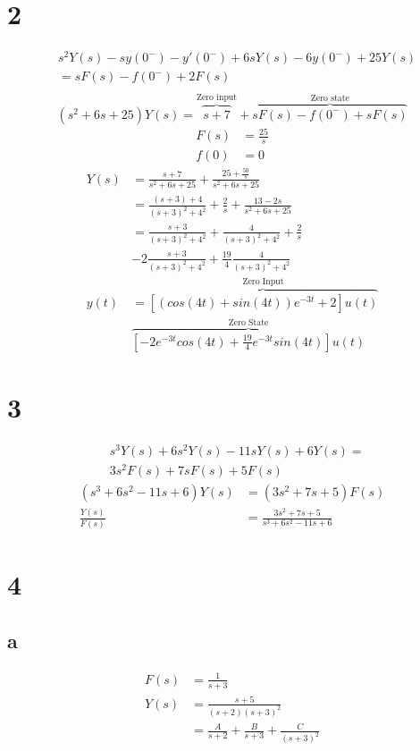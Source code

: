 \documentclass{article}
\begin{document}
\begin{multicols}{2}
\section*{2}
\begin{align*}
&s^2 Y(s) - s y(0^-) - y'(0^-) + 6 sY(s) - 6y(0^-)+25Y(s)\\
&= sF(s) - f(0^-) + 2F(s)\\
\end{align*}
\[
(s^2+6s+25)Y(s) = \overbrace{s+7}^{\text{Zero input}} + \overbrace{sF(s) - f(0^-) + sF(s)}^{\text{Zero state}}
\]
\begin{align*}
    F(s) &= \frac{25}{s}\\
    f(0) &= 0
\end{align*}
\begin{align*}
    Y(s) &= \frac{s+7}{s^2+6s+25} + \frac{25+ \frac{50}{s}}{s^2+6s+25}\\
    &= \frac{(s+3)+4}{(s+3)^2+4^2} + \frac{2}{s} + \frac{13-2s}{s^2+6s+25}\\
    &= \frac{s+3}{(s+3)^2+4^2} + \frac{4}{(s+3)^2+4^2} + \frac{2}{s}\\
    &-2 \frac{s+3}{(s+3)^2+4^2} + \frac{19}{4}\frac{4}{(s+3)^2+4^2}\\
    y(t) &= \overbrace{\left[\left( cos(4t) + sin(4t) \right) e^{-3t} + 2\right]u(t)}^{\text{Zero Input}}\\
    &\overbrace{\left[- 2e^{-3t}cos(4t) + \frac{19}{4}e^{-3t}sin(4t)\right]u(t)}^{\text{Zero State}}
\end{align*}
\section*{3}
\begin{align*}
&s^3 Y(s) + 6s^2 Y(s) -11 sY(s) + 6 Y(s) =\\
&3s^2 F(s) + 7sF(s) +5F(s)
\end{align*}
\begin{align*}
    (s^3 + 6s^2 -11 s + 6) Y(s) &= (3s^2 + 7s +5) F(s)\\
    \frac{Y(s)}{F(s)} &= \boxed{\frac{3s^2 + 7s +5}{s^3 + 6s^2 -11 s + 6}}
\end{align*}
\section*{4}
\subsection*{a}
\begin{align*}
    F(s) &= \frac{1}{s+3}\\
    Y(s) &= \frac{s+5}{(s+2)(s+3)^2}\\
    &= \frac{A}{s+2} + \frac{B}{s+3} + \frac{C}{(s+3)^2}
\end{align*}
    

\end{multicols}
\end{document}
